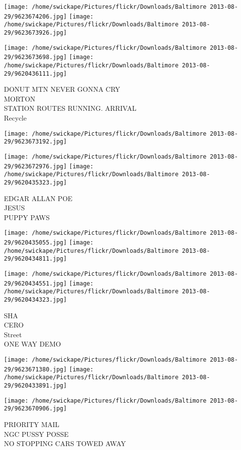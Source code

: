 \documentclass[10pt,letterpaper]{article}
\begin{document}
\texttt{[image: /home/swickape/Pictures/flickr/Downloads/Baltimore 2013-08-29/9623674206.jpg]}
\texttt{[image: /home/swickape/Pictures/flickr/Downloads/Baltimore 2013-08-29/9623673926.jpg]}

\texttt{[image: /home/swickape/Pictures/flickr/Downloads/Baltimore 2013-08-29/9623673698.jpg]}
\texttt{[image: /home/swickape/Pictures/flickr/Downloads/Baltimore 2013-08-29/9620436111.jpg]}

DONUT MTN NEVER GONNA CRY\\
MORTON\\
STATION ROUTES RUNNING. ARRIVAL\\
Recycle
\pagebreak

\texttt{[image: /home/swickape/Pictures/flickr/Downloads/Baltimore 2013-08-29/9623673192.jpg]}

\vspace{0.25in}
\texttt{[image: /home/swickape/Pictures/flickr/Downloads/Baltimore 2013-08-29/9623672976.jpg]}
\texttt{[image: /home/swickape/Pictures/flickr/Downloads/Baltimore 2013-08-29/9620435323.jpg]}

EDGAR ALLAN POE\\
JESUS\\
PUPPY PAWS
\pagebreak

\texttt{[image: /home/swickape/Pictures/flickr/Downloads/Baltimore 2013-08-29/9620435055.jpg]}
\texttt{[image: /home/swickape/Pictures/flickr/Downloads/Baltimore 2013-08-29/9620434811.jpg]}

\texttt{[image: /home/swickape/Pictures/flickr/Downloads/Baltimore 2013-08-29/9620434551.jpg]}
\texttt{[image: /home/swickape/Pictures/flickr/Downloads/Baltimore 2013-08-29/9620434323.jpg]}

SHA\\
CERO\\
Street\\
ONE WAY DEMO
\pagebreak

\texttt{[image: /home/swickape/Pictures/flickr/Downloads/Baltimore 2013-08-29/9623671380.jpg]}
\texttt{[image: /home/swickape/Pictures/flickr/Downloads/Baltimore 2013-08-29/9620433891.jpg]}

\texttt{[image: /home/swickape/Pictures/flickr/Downloads/Baltimore 2013-08-29/9623670906.jpg]}

PRIORITY MAIL\\
NGC PUSSY POSSE\\
NO STOPPING CARS TOWED AWAY
\pagebreak
\end{document}
